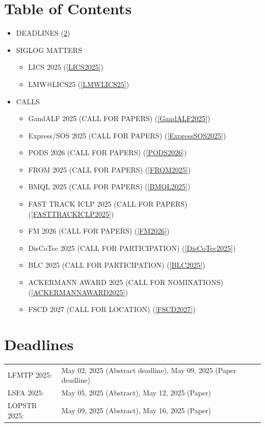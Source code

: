\documentclass[prodmode,acmtecs]{acmsmall} %
\begin{document}
\section{Table of Contents}\begin{itemize}\item DEADLINES (\cref{deadlines}) 
 
\item SIGLOG MATTERS 
 
\begin{itemize}\item LICS 2025 (\cref{LICS2025})
\item LMW@LICS25 (\cref{LMWLICS25})
\end{itemize} 
\item CALLS 
 
\begin{itemize}\item GandALF 2025 (CALL FOR PAPERS) (\cref{GandALF2025})
\item Express/SOS 2025 (CALL FOR PAPERS) (\cref{ExpressSOS2025})
\item PODS 2026 (CALL FOR PAPERS) (\cref{PODS2026})
\item FROM 2025 (CALL FOR PAPERS) (\cref{FROM2025})
\item BMQL 2025 (CALL FOR PAPERS) (\cref{BMQL2025})
\item FAST TRACK ICLP 2025 (CALL FOR PAPERS) (\cref{FASTTRACKICLP2025})
\item FM 2026 (CALL FOR PAPERS) (\cref{FM2026})
\item DisCoTec 2025 (CALL FOR PARTICIPATION) (\cref{DisCoTec2025})
\item BLC 2025 (CALL FOR PARTICIPATION) (\cref{BLC2025})
\item ACKERMANN AWARD 2025 (CALL FOR NOMINATIONS) (\cref{ACKERMANNAWARD2025})
\item FSCD 2027 (CALL FOR LOCATION) (\cref{FSCD2027})
\end{itemize} 
\end{itemize}\section{Deadlines}\label{deadlines}\begin{tabulary}{\linewidth}{LL}LFMTP 2025:  & May 02, 2025 (Abstract deadline), May 09, 2025 (Paper deadline) \\
LSFA 2025:  & May 05, 2025 (Abstract), May 12, 2025 (Paper) \\
LOPSTR 2025:  & May 09, 2025 (Abstract), May 16, 2025 (Paper) \\

\end{tabulary}
\end{document}
